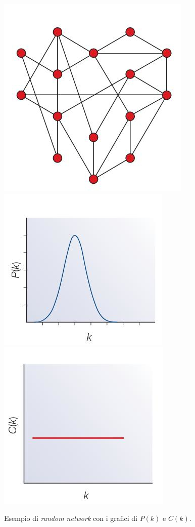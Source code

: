 \documentclass[a4paper,12pt, oneside]{book}
\begin{document}
\begin{figure}
  \centering
  \includegraphics[scale = 2.25]{img/rnet1.jpg}\\
  \includegraphics[scale = 1.75]{img/rnet2.jpg}
  \includegraphics[scale = 1.75]{img/rnet3.jpg}
  \caption{Esempio di \textit{random network} con i grafici di $P(k)$ e $C(k)$.}
  \label{fig:rnet}
\end{figure}
\newpage
\end{document}
